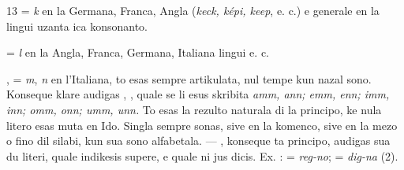 \begin{VUpage}[17]{13}
\VUblancAlinea
{} = \textit{k} en la Germana, Franca, Angla (\textit{keck, képi, keep}, e. c.)\nl
e generale en la lingui uzanta ica konsonanto.

\VUblancAlinea
{} = \textit{l} en la Angla, Franca, Germana, Italiana lingui e. c.

\VUblancAlinea
{},  = \textit{m}, \textit{n} en l'Italiana, to esas sempre artikulata, nul\cc
tempe kun nazal sono. Konseque \nl
{} klare audigas , , quale se li esus skribita\nl
\textit{amm, ann; emm, enn; imm, inn; omm, onn; umm, unn.} To\nl
esas la rezulto naturala di la principo, ke nula litero esas\nl
muta en Ido. Singla sempre sonas, sive en la komenco, sive\nl
en la mezo o fino dil silabi, kun sua sono alfabetala. --- ,\nl
konseque ta principo, audigas sua du literi,  quale indikesis\nl
supere, e  quale ni jus dicis. Ex. :  = \textit{reg-no}; \nl
= \textit{dig-na} (2).
\end{VUpage}

